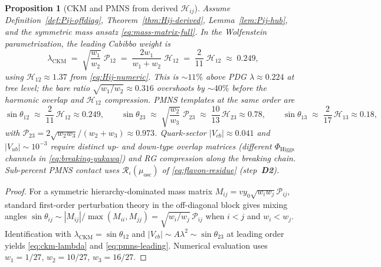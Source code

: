 \documentclass[aps,prd,onecolumn,amsmath,amssymb,nofootinbib,11pt]{revtex4-2}
\numberwithin{equation}{section}
\theoremstyle{plain}
\newtheorem{proposition}[theorem]{Proposition}
\theoremstyle{definition}
\theoremstyle{remark}
\begin{document}
\begin{proposition}[CKM and PMNS from derived $\mathcal{H}_{ij}$]
\label{prop:ckm-hierarchy}
Assume Definition~\ref{def:Pij-offdiag}, Theorem~\ref{thm:Hij-derived},
Lemma~\ref{lem:Pij-hub}, and the symmetric mass ansatz \eqref{eq:mass-matrix-full}.
In the Wolfenstein parametrization, the leading Cabibbo weight is
\begin{equation}\label{eq:ckm-lambda}
  \lambda_{\mathrm{CKM}}
  \;=\;
  \sqrt{\frac{w_1}{w_2}}\;\mathcal{P}_{12}
  \;=\;
  \frac{2w_1}{w_1+w_2}\;\mathcal{H}_{12}
  \;=\;
  \frac{2}{11}\;\mathcal{H}_{12}
  \;\approx\;
  0.249,
\end{equation}
using $\mathcal{H}_{12}\approx 1.37$ from \eqref{eq:Hij-numeric}. This is
$\sim11\%$ above PDG $\lambda\approx0.224$ at tree level; the bare ratio
$\sqrt{w_1/w_2}\approx0.316$ overshoots by $\sim40\%$ before the harmonic
overlap and $\mathcal{H}_{12}$ compression. PMNS templates at the same order
are
\begin{equation}\label{eq:pmns-leading}
  \sin\theta_{12}
  \;\approx\;
  \frac{2}{11}\,\mathcal{H}_{12}\approx 0.249,
  \qquad
  \sin\theta_{23}
  \;\approx\;
  \sqrt{\frac{w_2}{w_3}}\;\mathcal{P}_{23}
  \;\approx\;
  \frac{10}{13}\,\mathcal{H}_{23}\approx 0.78,
  \qquad
  \sin\theta_{13}
  \;\approx\;
  \frac{2}{17}\,\mathcal{H}_{13}\approx 0.18,
\end{equation}
with $\mathcal{P}_{23}=2\sqrt{w_2w_3}/(w_2+w_3)\approx0.973$. Quark-sector
$|V_{cb}|\approx0.041$ and $|V_{ub}|\sim10^{-3}$ require distinct up- and
down-type overlap matrices (different $\Phi_{\mathrm{Higgs}}$ channels in
\eqref{eq:breaking-yukawa}) and RG compression along the breaking chain.
Sub-percent PMNS contact uses $\mathcal{R}_\iota(\mu_{\mathrm{osc}})$ of
\eqref{eq:flavon-residue} (step~\textbf{D2}).
\end{proposition}

\begin{proof}
For a symmetric hierarchy-dominated mass matrix
$M_{ij}=v y_0\sqrt{w_iw_j}\mathcal{P}_{ij}$, standard first-order perturbation
theory in the off-diagonal block gives mixing angles
$\sin\theta_{ij}\sim|M_{ij}|/\max(M_{ii},M_{jj})
=\sqrt{w_i/w_j}\,\mathcal{P}_{ij}$ when $i<j$ and $w_i<w_j$.
Identification with $\lambda_{\mathrm{CKM}}=\sin\theta_{12}$ and
$|V_{cb}|\sim A\lambda^2\sim\sin\theta_{23}$ at leading order yields
\eqref{eq:ckm-lambda} and \eqref{eq:pmns-leading}. Numerical evaluation uses
$w_1=1/27$, $w_2=10/27$, $w_3=16/27$.
\end{proof}
\end{document}
